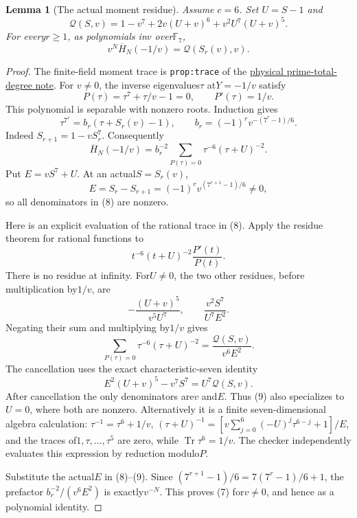 \documentclass[11pt]{article}
\newtheorem{lemma}{Lemma}\newtheorem{theorem}[lemma]{Theorem}
\begin{document}
\begin{lemma}[The actual moment residue]\label{lem:moment-residue}
Assume $c=6$. Set $U=S-1$ and
\[
 \mathcal Q(S,v)=1-v^7+2v(U+v)^6+v^2U^7(U+v)^5 .
\]
For every$r\ge1$, as polynomials in$v$ over$\mathbb F_7$,
\[
       v^N\overline H_N(-1/v)=\mathcal Q(S_r(v),v).                  \tag{7}
\]
\end{lemma}
\begin{proof}
The finite-field moment trace is \texttt{prop:trace} of the
\href{PHYSICAL_PRIME_TOTAL_DEGREE_REDUCTION.tex}
{physical prime-total-degree note}.
For $v\ne0$, the inverse eigenvalues$\tau$ at$Y=-1/v$ satisfy
\[
 P(\tau)=\tau^7+\tau/v-1=0,\qquad P'(\tau)=1/v.
\]
This polynomial is separable with nonzero roots.
Induction gives
\[
 \tau^{7^r}=b_r(\tau+S_r(v)-1),\qquad
 b_r=(-1)^rv^{-(7^r-1)/6}.
\]
Indeed $S_{r+1}=1-vS_r^7$.
Consequently
\[
 \overline H_N(-1/v)
      =b_r^{-2}\sum_{P(\tau)=0}\tau^{-6}(\tau+U)^{-2}.      \tag{8}
\]
Put $E=vS^7+U$.
At an actual$S=S_r(v)$,
\[
 E=S_r-S_{r+1}=(-1)^rv^{(7^{r+1}-1)/6}\ne0,
\]
so all denominators in (8) are nonzero.

Here is an explicit evaluation of the rational trace in (8).
Apply the residue theorem for rational functions to
\[
       t^{-6}(t+U)^{-2}\frac{P'(t)}{P(t)}.
\]
There is no residue at infinity. For$U\ne0$, the two other
residues, before multiplication by$1/v$, are
\[
 -\frac{(U+v)^5}{v^5U^7},\qquad
                 \frac{v^2S^7}{U^7E^2}.
\]
Negating their sum and multiplying by$1/v$ gives
\[
 \sum_{P(\tau)=0}\tau^{-6}(\tau+U)^{-2}
                         =\frac{\mathcal Q(S,v)}{v^6E^2}.          \tag{9}
\]
The cancellation uses the exact characteristic-seven identity
\[
 E^2(U+v)^5-v^7S^7=U^7\mathcal Q(S,v).
\]
After cancellation the only denominators are$v$ and$E$.
Thus (9) also specializes to$U=0$, where both are nonzero.
Alternatively it is a finite seven-dimensional algebra calculation:
$\tau^{-1}=\tau^6+1/v$,
$(\tau+U)^{-1}=
 [v\sum_{j=0}^6(-U)^j\tau^{6-j}+1]/E$,
and the traces of$1,\tau,\ldots,\tau^5$ are zero, while
$\operatorname{Tr}\tau^6=1/v$.
The checker independently evaluates this expression by reduction
modulo$P$.

Substitute the actual$E$ in (8)--(9).
Since $(7^{r+1}-1)/6=7(7^r-1)/6+1$,
the prefactor $b_r^{-2}/(v^6E^2)$ is exactly$v^{-N}$.
This proves (7) for$v\ne0$, and hence as a polynomial identity.
\end{proof}
\end{document}
